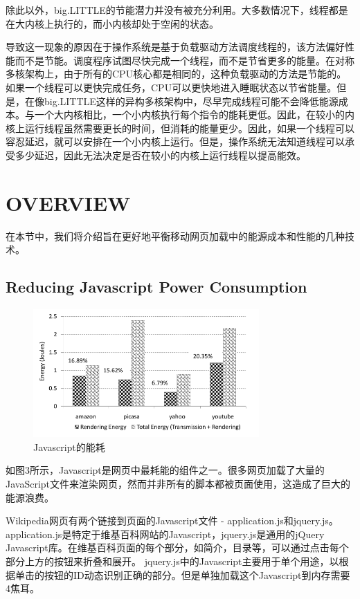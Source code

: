 \documentclass{sig-alternate-05-2015}
\begin{document}
除此以外，big.LITTLE的节能潜力并没有被充分利用。大多数情况下，线程都是在大内核上执行的，而小内核却处于空闲的状态。

导致这一现象的原因在于操作系统是基于负载驱动方法调度线程的，该方法偏好性能而不是节能。调度程序试图尽快完成一个线程，而不是节省更多的能量。在对称多核架构上，由于所有的CPU核心都是相同的，这种负载驱动的方法是节能的。如果一个线程可以更快完成任务，CPU可以更快地进入睡眠状态以节省能量。\cite{7}但是，在像big.LITTLE这样的异构多核架构中，尽早完成线程可能不会降低能源成本。与一个大内核相比，一个小内核执行每个指令的能耗更低。因此，在较小的内核上运行线程虽然需要更长的时间，但消耗的能量更少。因此，如果一个线程可以容忍延迟，就可以安排在一个小内核上运行。但是，操作系统无法知道线程可以承受多少延迟，因此无法决定是否在较小的内核上运行线程以提高能效。

\section{OVERVIEW}

在本节中，我们将介绍旨在更好地平衡移动网页加载中的能源成本和性能的几种技术。

\subsection{Reducing Javascript Power Consumption}

\begin{figure}[htbp]
	\centering
	\includegraphics[width=3.4in]{./figure2}
	\caption{Javascript的能耗}\label{fig:tasks}
\end{figure}


如图3所示\cite{13}，Javascript是网页中最耗能的组件之一。很多网页加载了大量的JavaScript文件来渲染网页，然而并非所有的脚本都被页面使用，这造成了巨大的能源浪费。

Wikipedia网页有两个链接到页面的Javascript文件 - application.js和jquery.js。 application.js是特定于维基百科网站的Javascript，jquery.js是通用的jQuery Javascript库。在维基百科页面的每个部分，如简介，目录等，可以通过点击每个部分上方的按钮来折叠和展开。 jquery.js中的Javascript主要用于单个用途，以根据单击的按钮的ID动态识别正确的部分。但是单独加载这个Javascript到内存需要4焦耳。
\end{document}
